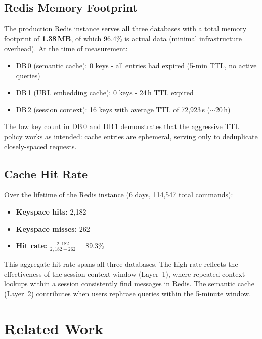 \documentclass[conference]{IEEEtran}
\begin{document}
\subsection{Redis Memory Footprint}

The production Redis instance serves all three databases with a total memory footprint of \textbf{1.38\,MB}, of which 96.4\% is actual data (minimal infrastructure overhead). At the time of measurement:

\begin{itemize}
\item DB\,0 (semantic cache): 0 keys - all entries had expired (5-min TTL, no active queries)
\item DB\,1 (URL embedding cache): 0 keys - 24\,h TTL expired
\item DB\,2 (session context): 16 keys with average TTL of 72{,}923\,s (${\sim}20$\,h)
\end{itemize}

The low key count in DB\,0 and DB\,1 demonstrates that the aggressive TTL policy works as intended: cache entries are ephemeral, serving only to deduplicate closely-spaced requests.

\subsection{Cache Hit Rate}

Over the lifetime of the Redis instance (6 days, 114{,}547 total commands):

\begin{itemize}
\item \textbf{Keyspace hits:} 2{,}182
\item \textbf{Keyspace misses:} 262
\item \textbf{Hit rate:} $\frac{2{,}182}{2{,}182 + 262} = \mathbf{89.3\%}$
\end{itemize}

This aggregate hit rate spans all three databases. The high rate reflects the effectiveness of the session context window (Layer~1), where repeated context lookups within a session consistently find messages in Redis. The semantic cache (Layer~2) contributes when users rephrase queries within the 5-minute window.

\section{Related Work}
\label{sec:related}
\end{document}
